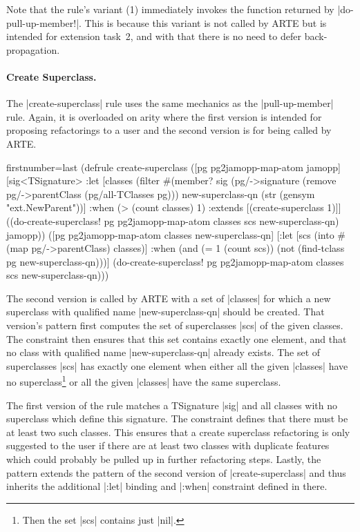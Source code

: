 \documentclass[submission]{eptcs}
\newcommand{\code}{\clojureinline}
\begin{document}
Note that the rule's variant (1) immediately invokes the function returned by
\code|do-pull-up-member!|.  This is because this variant is not called by ARTE
but is intended for extension task~2, and with that there is no need to defer
back-propagation.



\paragraph{Create Superclass.}

The \code|create-superclass| rule uses the same mechanics as the
\code|pull-up-member| rule.  Again, it is overloaded on arity where the first
version is intended for proposing refactorings to a user and the second version
is for being called by ARTE.

\begin{clojurecode*}{firstnumber=last}
(defrule create-superclass
  ([pg pg2jamopp-map-atom jamopp]
   [sig<TSignature>
    :let [classes (filter #(member? sig (pg/->signature %
                          (remove pg/->parentClass (pg/all-TClasses pg)))
          new-superclass-qn (str (gensym "ext.NewParent"))]
    :when (> (count classes) 1)
    :extends [(create-superclass 1)]]
   ((do-create-superclass! pg pg2jamopp-map-atom classes scs new-superclass-qn)
    jamopp))
  ([pg pg2jamopp-map-atom classes new-superclass-qn]
   [:let [scs (into #{} (map pg/->parentClass) classes)]
    :when (and (= 1 (count scs))
               (not (find-tclass pg new-superclass-qn)))]
   (do-create-superclass! pg pg2jamopp-map-atom classes scs new-superclass-qn)))
\end{clojurecode*}

The second version is called by ARTE with a set of \code|classes| for which a
new superclass with qualified name \code|new-superclass-qn| should be created.
That version's pattern first computes the set of superclasses \code|scs| of the
given classes.  The constraint then ensures that this set contains exactly one
element, and that no class with qualified name \code|new-superclass-qn| already
exists.  The set of superclasses \code|scs| has exactly one element when either
all the given \code|classes| have no superclass\footnote{Then the set
  \code|scs| contains just \code|nil|.} or all the given \code|classes| have
the same superclass.

The first version of the rule matches a \textsf{TSignature} \code|sig| and all
classes with no superclass which define this signature.  The constraint defines
that there must be at least two such classes.  This ensures that a create
superclass refactoring is only suggested to the user if there are at least two
classes with duplicate features which could probably be pulled up in further
refactoring steps.  Lastly, the pattern extends the pattern of the second
version of \code|create-superclass| and thus inherits the additional
\code|:let| binding and \code|:when| constraint defined in there.
\end{document}
